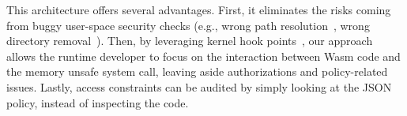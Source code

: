 This architecture offers several advantages. First, it eliminates the
risks coming from buggy user-space security checks (e.g., wrong
path resolution~\cite{parentfix}, wrong directory
removal~\cite{removedirfix}). Then, by leveraging kernel hook
points~\cite{bpf-lsm-hooks}, our approach allows the runtime developer
to focus on the interaction between Wasm code and the memory unsafe
system call, leaving aside authorizations and policy-related issues.
Lastly, access constraints can be audited by simply looking at the
JSON policy, instead of inspecting the code.


